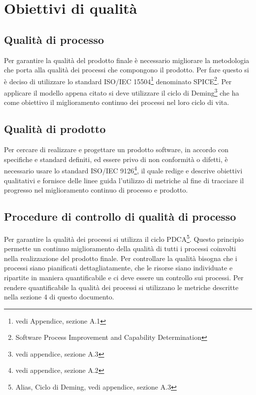 \newpage
\section{Obiettivi di qualità}%
\label{2.0}
\subsection{Qualità di processo} %
\label{2.1}
Per garantire la qualità del prodotto finale è necessario migliorare la metodologia che porta alla qualità dei processi che compongono il prodotto. Per fare questo si è deciso di utilizzare lo standard ISO/IEC 15504\footnote{vedi Appendice, sezione A.1} denominato SPICE\footnote{Software Process Improvement and Capability Determination}.
Per applicare il modello appena citato si deve utilizzare il ciclo di Deming\footnote{vedi appendice, sezione A.3} che ha come obiettivo il miglioramento continuo dei processi nel loro ciclo di vita.

\subsection{Qualità di prodotto} %
\label{2.2}
Per cercare di realizzare e progettare un prodotto software, in accordo con specifiche e standard definiti, ed essere privo di non conformità o difetti, è necessario usare lo standard ISO/IEC 9126\footnote{vedi appendice, sezione A.2}, il quale redige e descrive obiettivi qualitativi e fornisce delle linee guida l'utilizzo di metriche al fine di tracciare il progresso nel miglioramento continuo di processo e prodotto.

\subsection{Procedure di controllo di qualità di processo} %
\label{2.3}
Per garantire la qualità dei processi si utilizza il ciclo PDCA\footnote{Alias, Ciclo di Deming, vedi appendice, sezione A.3}.  Questo principio permette un continuo miglioramento della qualità di tutti i processi coinvolti nella realizzazione del prodotto finale.
Per controllare la qualità bisogna che i processi siano pianificati dettagliatamente, che le risorse siano individuate e ripartite in maniera quantificabile e ci deve essere un controllo sui processi.
Per rendere quantificabile la qualità dei processi si utilizzano le metriche descritte nella sezione 4 di questo documento.

